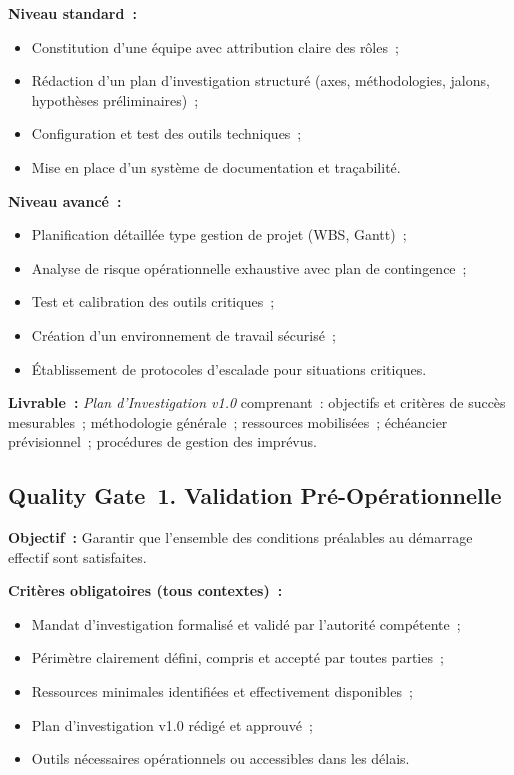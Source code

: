 \textbf{Niveau standard~:}
\begin{itemize}
    \item Constitution d'une équipe avec attribution claire des rôles~;
    \item Rédaction d'un plan d'investigation structuré (axes, méthodologies,
          jalons, hypothèses préliminaires)~;
    \item Configuration et test des outils techniques~;
    \item Mise en place d'un système de documentation et traçabilité.
\end{itemize}

\textbf{Niveau avancé~:}
\begin{itemize}
    \item Planification détaillée type gestion de projet (WBS, Gantt)~;
    \item Analyse de risque opérationnelle exhaustive avec plan de contingence~;
    \item Test et calibration des outils critiques~;
    \item Création d'un environnement de travail sécurisé~;
    \item Établissement de protocoles d'escalade pour situations critiques.
\end{itemize}

\textbf{Livrable~:} \textit{Plan d'Investigation v1.0} comprenant~: objectifs
et critères de succès mesurables~; méthodologie générale~; ressources mobilisées~;
échéancier prévisionnel~; procédures de gestion des imprévus.

\subsection{Quality Gate~1. Validation Pré-Opérationnelle}

\textbf{Objectif~:} Garantir que l'ensemble des conditions préalables au démarrage
effectif sont satisfaites.

\textbf{Critères obligatoires (tous contextes)~:}
\begin{itemize}
    \item Mandat d'investigation formalisé et validé par l'autorité compétente~;
    \item Périmètre clairement défini, compris et accepté par toutes parties~;
    \item Ressources minimales identifiées et effectivement disponibles~;
    \item Plan d'investigation v1.0 rédigé et approuvé~;
    \item Outils nécessaires opérationnels ou accessibles dans les délais.
\end{itemize}

